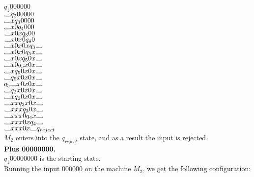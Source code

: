 \documentclass[12pt]{article}
\newcommand\Vtextvisiblespace[1][.8em]{%
	\mbox{\kern.07em\vrule height.3ex}%
	\vbox{\hrule width#1}%
	\hbox{\vrule height.3ex}}
\begin{document}
$q_1 000000$ \\
$\Vtextvisiblespace       q_2 00000 $  \\
$\Vtextvisiblespace x     q_3 0000 $ \\
$\Vtextvisiblespace x0    q_4 000 $ \\
$\Vtextvisiblespace x0x   q_3 00 $ \\
$\Vtextvisiblespace x0x0  q_4 0 $ \\
$\Vtextvisiblespace x0x0x q_3 \Vtextvisiblespace $ \\
$\Vtextvisiblespace x0x0  q_5 x \Vtextvisiblespace $ \\
$\Vtextvisiblespace x0x   q_5 0x \Vtextvisiblespace $ \\
$\Vtextvisiblespace x0    q_5 x0x \Vtextvisiblespace $ \\
$\Vtextvisiblespace x     q_5 0x0x \Vtextvisiblespace $ \\
$\Vtextvisiblespace       q_5 x0x0x \Vtextvisiblespace $ \\
$q_5 \Vtextvisiblespace x0x0x \Vtextvisiblespace $ \\
$\Vtextvisiblespace       q_2 x0x0x \Vtextvisiblespace $ \\
$\Vtextvisiblespace x     q_2 0x0x \Vtextvisiblespace $ \\
$\Vtextvisiblespace xx    q_3 x0x \Vtextvisiblespace $ \\
$\Vtextvisiblespace xxx   q_3 0x \Vtextvisiblespace $ \\
$\Vtextvisiblespace xxx0  q_4 x \Vtextvisiblespace $ \\
$\Vtextvisiblespace xxx0x q_4  \Vtextvisiblespace $ \\
$\Vtextvisiblespace xxx0x \Vtextvisiblespace q_{reject} $ \\
$M_2$ enters into the $q_{reject}$ state, and as a result the input is rejected. \\

\pagebreak
\textbf{Plus 00000000.} \\

$q_1 00000000$ is the starting state. \\
Running the input 000000 on the machine $M_2$, we get the following configuration: \\
\end{document}
